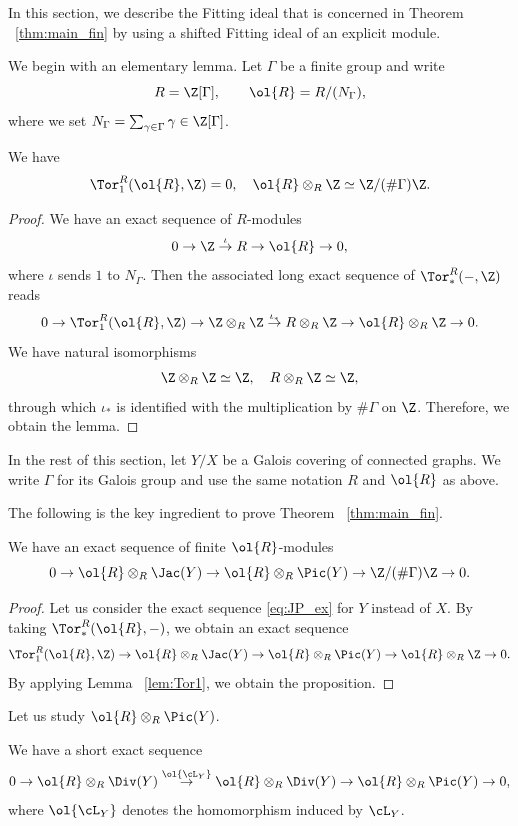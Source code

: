In this section, we describe the Fitting ideal that is concerned in Theorem ~\ref{thm:main_fin} by using a shifted Fitting ideal of an explicit module.

We begin with an elementary lemma.
Let $\Gamma$ be a finite group and write
\[
R = \Z[\Gamma],
\qquad
\ol{R} = R/(N_{\Gamma}),
\]
where we set $N_{\Gamma} = \sum_{\gamma \in \Gamma} \gamma \in \Z[\Gamma]$.

\begin{lemm}\label{lem:Tor1}
We have
\[
\Tor_1^R(\ol{R}, \Z) = 0,
\quad
\ol{R} \otimes_R \Z \simeq \Z/(\# \Gamma)\Z.
\]
\end{lemm}

\begin{proof}
We have an exact sequence of $R$-modules
\[
0 \to \Z \overset{\iota}{\to} R \to \ol{R} \to 0,
\]
where $\iota$ sends $1$ to $N_{\Gamma}$.
Then the associated long exact sequence of $\Tor_{*}^R(-, \Z)$ reads
\[
0 \to \Tor_1^R(\ol{R}, \Z) \to \Z \otimes_R \Z \overset{\iota_*}{\to} R \otimes_R \Z \to \ol{R} \otimes_R \Z \to 0.
\]
We have natural isomorphisms
\[
\Z \otimes_R \Z \simeq \Z,
\quad
R \otimes_R \Z \simeq \Z,
\]
through which $\iota_*$ is identified with the multiplication by $\# \Gamma$ on $\Z$.
Therefore, we obtain the lemma.
\end{proof}

In the rest of this section, let $Y/X$ be a Galois covering of connected graphs.
We write $\Gamma$ for its Galois group and use the same notation $R$ and $\ol{R}$ as above.

The following is the key ingredient to prove Theorem ~\ref{thm:main_fin}.

\begin{prop}\label{prop:Jac_ex1}
We have an exact sequence of finite $\ol{R}$-modules
\[
0 \to \ol{R} \otimes_R \Jac(Y) \to \ol{R} \otimes_R \Pic(Y) \to \Z/(\# \Gamma)\Z \to 0.
\]
\end{prop}

\begin{proof}
Let us consider the exact sequence \eqref{eq:JP_ex} for $Y$ instead of $X$.
By taking $\Tor_*^R(\ol{R}, -)$, we obtain an exact sequence
\[
\Tor_1^R(\ol{R}, \Z) \to \ol{R} \otimes_R \Jac(Y) \to \ol{R} \otimes_R \Pic(Y) \to \ol{R} \otimes_R \Z \to 0.
\]
By applying Lemma ~\ref{lem:Tor1}, we obtain the proposition.
\end{proof}

Let us study $\ol{R} \otimes_R \Pic(Y)$.

\begin{lemm}\label{lem:olPic}
We have a short exact sequence
\[
0 \to\ol{R} \otimes_R \Div(Y) \overset{\ol{\cL_{Y}}}{\to} \ol{R} \otimes_R \Div(Y) \to \ol{R} \otimes_R \Pic(Y) \to 0,
\]
where $\ol{\cL_Y}$ denotes the homomorphism induced by $\cL_Y$.
\end{lemm}

